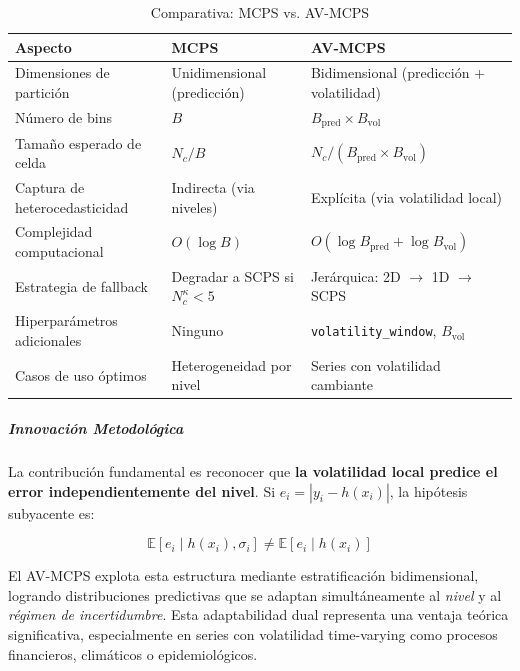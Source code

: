 \begin{table}[htbp]
\centering
\caption{Comparativa: MCPS vs. AV-MCPS}
\label{tab:avmcps_vs_mcps}
\small
\begin{tabular}{>{\raggedright\arraybackslash}p{3.5cm}%
                >{\raggedright\arraybackslash}p{5cm}%
                >{\raggedright\arraybackslash}p{5cm}}
\toprule
\textbf{Aspecto} & \textbf{MCPS} & \textbf{AV-MCPS} \\
\midrule
Dimensiones de partición & Unidimensional (predicción) & Bidimensional (predicción + volatilidad) \\
Número de bins & $B$ & $B_{\text{pred}} \times B_{\text{vol}}$ \\
Tamaño esperado de celda & $N_c / B$ & $N_c / (B_{\text{pred}} \times B_{\text{vol}})$ \\
Captura de heterocedasticidad & Indirecta (via niveles) & Explícita (via volatilidad local) \\
Complejidad computacional & $O(\log B)$ & $O(\log B_{\text{pred}} + \log B_{\text{vol}})$ \\
Estrategia de fallback & Degradar a SCPS si $N_c^{\kappa} < 5$ & Jerárquica: 2D $\to$ 1D $\to$ SCPS \\
Hiperparámetros adicionales & Ninguno & \texttt{volatility\_window}, $B_{\text{vol}}$ \\
Casos de uso óptimos & Heterogeneidad por nivel & Series con volatilidad cambiante \\
\bottomrule
\end{tabular}
\end{table}

\subparagraph{Innovación Metodológica}

La contribución fundamental es reconocer que \textbf{la volatilidad local predice el error independientemente del nivel}. Si $e_i = |y_i - h(x_i)|$, la hipótesis subyacente es:

\begin{equation}
\mathbb{E}[e_i \mid h(x_i), \sigma_i] \neq \mathbb{E}[e_i \mid h(x_i)]
\end{equation}

El AV-MCPS explota esta estructura mediante estratificación bidimensional, logrando distribuciones predictivas que se adaptan simultáneamente al \textit{nivel} y al \textit{régimen de incertidumbre}. Esta adaptabilidad dual representa una ventaja teórica significativa, especialmente en series con volatilidad time-varying como procesos financieros, climáticos o epidemiológicos.

